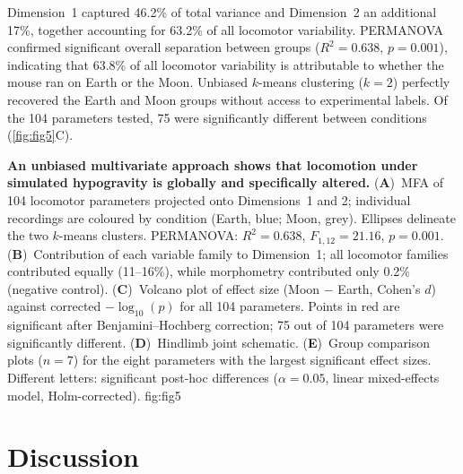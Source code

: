 \documentclass[blue]{enslyonstage}
\begin{document}
Dimension~1 captured 46.2\% of total variance and Dimension~2 an additional
17\%, together accounting for 63.2\% of all locomotor variability.
PERMANOVA confirmed significant overall separation between groups
($R^2 = 0.638$, $p = 0.001$), indicating that 63.8\% of all locomotor
variability is attributable to whether the mouse ran on Earth or the Moon.
Unbiased $k$-means clustering ($k = 2$) perfectly recovered the Earth and Moon
groups without access to experimental labels. Of the 104 parameters tested, 75
were significantly different between conditions (\autoref{fig:fig5}C).

%
{%
\textbf{An unbiased multivariate approach shows that locomotion under simulated
hypogravity is globally and specifically altered.}
(\textbf{A})~MFA of 104 locomotor parameters projected onto Dimensions~1 and
2; individual recordings are coloured by condition (Earth, blue; Moon, grey).
Ellipses delineate the two $k$-means clusters. PERMANOVA:
$R^2 = 0.638$, $F_{1,12} = 21.16$, $p = 0.001$.
(\textbf{B})~Contribution of each variable family to Dimension~1; all
locomotor families contributed equally (11--16\%), while morphometry
contributed only 0.2\% (negative control).
(\textbf{C})~Volcano plot of effect size (Moon $-$ Earth, Cohen's $d$)
against corrected $-\log_{10}(p)$ for all 104 parameters. Points in red are
significant after Benjamini–Hochberg correction; 75 out of 104 parameters
were significantly different.
(\textbf{D})~Hindlimb joint schematic.
(\textbf{E})~Group comparison plots ($n = 7$) for the eight parameters with
the largest significant effect sizes. Different letters: significant post-hoc
differences ($\alpha = 0.05$, linear mixed-effects model, Holm-corrected).%
}{fig:fig5}

\section{Discussion}
\label{sec:discussion}
%
\end{document}
